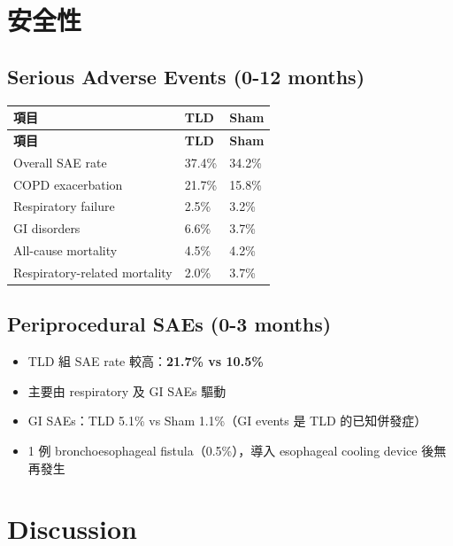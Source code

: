 \documentclass[12pt,a4paper]{article}
\begin{document}
\section{安全性}

\subsection{Serious Adverse Events (0-12 months)}

\begin{longtable}{p{6cm}p{4cm}p{4cm}}
\toprule
\textbf{項目} & \textbf{TLD} & \textbf{Sham} \\
\midrule
\endfirsthead

\toprule
\textbf{項目} & \textbf{TLD} & \textbf{Sham} \\
\midrule
\endhead

\bottomrule
\endfoot

Overall SAE rate & 37.4\% & 34.2\% \\
\midrule
COPD exacerbation & 21.7\% & 15.8\% \\
\midrule
Respiratory failure & 2.5\% & 3.2\% \\
\midrule
GI disorders & 6.6\% & 3.7\% \\
\midrule
All-cause mortality & 4.5\% & 4.2\% \\
\midrule
Respiratory-related mortality & 2.0\% & 3.7\% \\
\bottomrule
\end{longtable}

\subsection{Periprocedural SAEs (0-3 months)}

\begin{itemize}
    \item TLD 組 SAE rate 較高：\textbf{21.7\% vs 10.5\%}
    \item 主要由 respiratory 及 GI SAEs 驅動
    \item GI SAEs：TLD 5.1\% vs Sham 1.1\%（GI events 是 TLD 的已知併發症）
    \item 1 例 bronchoesophageal fistula（0.5\%），導入 esophageal cooling device 後無再發生
\end{itemize}

\section{Discussion}
\end{document}
